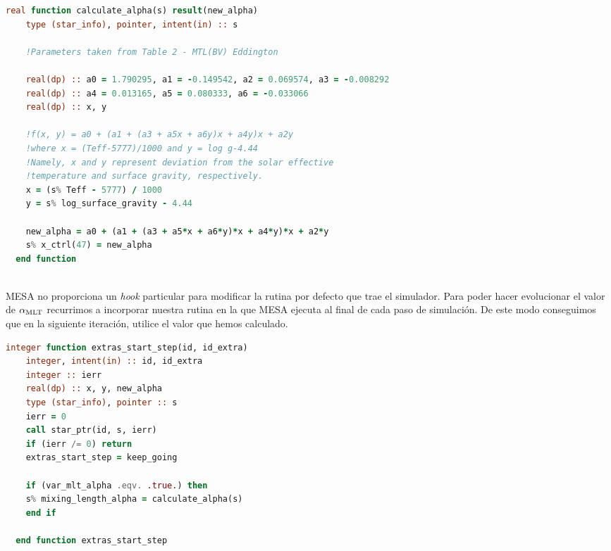 \begin{lstlisting}[language=Fortran, float, caption={Rutina de $\amlt$ variable.}, label={lst:var_amlt}]
  real function calculate_alpha(s) result(new_alpha)
	type (star_info), pointer, intent(in) :: s
	
	!Parameters taken from Table 2 - MTL(BV) Eddington
	
	real(dp) :: a0 = 1.790295, a1 = -0.149542, a2 = 0.069574, a3 = -0.008292
	real(dp) :: a4 = 0.013165, a5 = 0.080333, a6 = -0.033066
	real(dp) :: x, y
	
	!f(x, y) = a0 + (a1 + (a3 + a5x + a6y)x + a4y)x + a2y
	!where x = (Teff-5777)/1000 and y = log g-4.44
	!Namely, x and y represent deviation from the solar effective 
	!temperature and surface gravity, respectively.
	x = (s% Teff - 5777) / 1000
	y = s% log_surface_gravity - 4.44
	
	new_alpha = a0 + (a1 + (a3 + a5*x + a6*y)*x + a4*y)*x + a2*y
	s% x_ctrl(47) = new_alpha
  end function
	
\end{lstlisting}

MESA no proporciona un \textit{hook} particular para modificar la rutina por defecto que trae el simulador. Para poder hacer evolucionar el valor de $\alpha_{\mathrm{MLT}}$ recurrimos a incorporar nuestra rutina en la que MESA ejecuta al final de cada paso de simulación. De este modo conseguimos que en la siguiente iteración, utilice el valor que hemos calculado.
\begin{lstlisting}[language=Fortran, float, caption={Rutina de MESA para ejecutar lógica adicional tras la ejecución de un paso de simulación.}, label={lst:extra_start_step}]
  integer function extras_start_step(id, id_extra)
	integer, intent(in) :: id, id_extra
	integer :: ierr
	real(dp) :: x, y, new_alpha
	type (star_info), pointer :: s
	ierr = 0
	call star_ptr(id, s, ierr)
	if (ierr /= 0) return
	extras_start_step = keep_going
	
	if (var_mlt_alpha .eqv. .true.) then
	s% mixing_length_alpha = calculate_alpha(s)
	end if
	
  end function extras_start_step
\end{lstlisting}

\endinput

